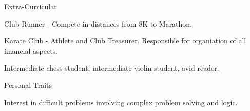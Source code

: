 \documentclass{resume} %
\begin{document}
\begin{rSection}{Extra-Curricular} \itemsep -3pt
	\item Club Runner - Compete in distances from 8K to Marathon.
	\item Karate Club - Athlete and Club Treasurer. Responsible for organiation of all financial aspects.
	\item Intermediate chess student, intermediate violin student, avid reader.
\end{rSection}

\begin{rSection}{Personal Traits}
\item Interest in difficult problems involving complex problem solving and logic.
\end{rSection}
\end{document}
